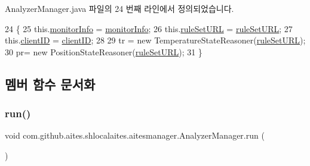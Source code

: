 Analyzer\+Manager.\+java 파일의 24 번째 라인에서 정의되었습니다.


\begin{DoxyCode}
24                                                                                              \{
25         this.\mbox{\hyperlink{classcom_1_1github_1_1aites_1_1shlocalaites_1_1aitesmanager_1_1_analyzer_manager_a158935ea553bae7475409e5a065d6576}{monitorInfo}} = \mbox{\hyperlink{classcom_1_1github_1_1aites_1_1shlocalaites_1_1aitesmanager_1_1_analyzer_manager_a158935ea553bae7475409e5a065d6576}{monitorInfo}};
26         this.\mbox{\hyperlink{classcom_1_1github_1_1aites_1_1shlocalaites_1_1aitesmanager_1_1_analyzer_manager_af225145a9ef067c87f773bbef60ec5d8}{ruleSetURL}} = \mbox{\hyperlink{classcom_1_1github_1_1aites_1_1shlocalaites_1_1aitesmanager_1_1_analyzer_manager_af225145a9ef067c87f773bbef60ec5d8}{ruleSetURL}};
27         this.\mbox{\hyperlink{classcom_1_1github_1_1aites_1_1shlocalaites_1_1aitesmanager_1_1_analyzer_manager_a4c88d935af5617842aecd9686483de67}{clientID}} = \mbox{\hyperlink{classcom_1_1github_1_1aites_1_1shlocalaites_1_1aitesmanager_1_1_analyzer_manager_a4c88d935af5617842aecd9686483de67}{clientID}};
28         
29         tr = \textcolor{keyword}{new} TemperatureStateReasoner(\mbox{\hyperlink{classcom_1_1github_1_1aites_1_1shlocalaites_1_1aitesmanager_1_1_analyzer_manager_af225145a9ef067c87f773bbef60ec5d8}{ruleSetURL}});
30         pr= \textcolor{keyword}{new} PositionStateReasoner(\mbox{\hyperlink{classcom_1_1github_1_1aites_1_1shlocalaites_1_1aitesmanager_1_1_analyzer_manager_af225145a9ef067c87f773bbef60ec5d8}{ruleSetURL}});
31     \}
\end{DoxyCode}


\subsection{멤버 함수 문서화}
\mbox{\label{classcom_1_1github_1_1aites_1_1shlocalaites_1_1aitesmanager_1_1_analyzer_manager_abba2aecdbbcf6675496f814109cb21a4}} 
\subsubsection{\texorpdfstring{run()}{run()}}
{\footnotesize\ttfamily void com.\+github.\+aites.\+shlocalaites.\+aitesmanager.\+Analyzer\+Manager.\+run (\begin{DoxyParamCaption}{ }\end{DoxyParamCaption})}



